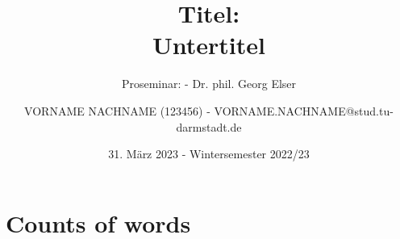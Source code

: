 \documentclass[
	ngerman, 
	fontsize=9pt,
	accentcolor=1b,%
	type=intern,
	marginpar=false,
	custommargins=geometry
	]{tudapub}
\let\endcm=\endlist
\newcommand\wordcount{
}
\begin{document}
\title{Titel: \\ Untertitel}
\subtitle{Proseminar:  - Dr. phil. Georg Elser}
\author{VORNAME NACHNAME (123456) - VORNAME.NACHNAME@stud.tu-darmstadt.de }
\date{31. März 2023 - Wintersemester 2022/23} %

\maketitle
{} 
\fontsize{12pt}{14.4}\selectfont %

\tableofcontents
\newpage


\section*{Counts of words} 
\begin{cm}
\wordcount	
\end{cm}

\listoftodos
\newpage

\begin{cm}

\end{cm}
\endcm



\end{document}
